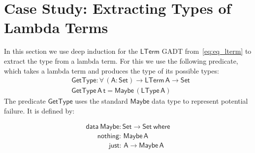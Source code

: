 \documentclass[9pt]{entcs}
\begin{document}
\section{Case Study: Extracting Types of Lambda Terms}\label{sec:app}

In this section we use deep induction for the $\mathsf{LTerm}$ GADT
from~\eqref{eq:eq_lterm} to extract the type from a lambda term.  For
this we use the following predicate, which takes a lambda term and
produces the type of its possible types:
\begin{align*}
  &\mathsf{GetType : \forall \, (A : Set) \to LTerm\,A \to Set} \\
  &\mathsf{GetType \,A \,t = Maybe \, (LType \, A)}
\end{align*}
The predicate $\mathsf{GetType}$ uses the standard $\mathsf{Maybe}$
data type to represent potential failure. It is defined by:

\vspace*{-0.1in}

\begin{equation}\label{eq:maybe}
\begin{array}{l}
\mathsf{data\ Maybe : Set \to Set\ where}\\
\mathsf{\;\;\;\;\;\;nothing :\, Maybe\,A}\\
\mathsf{\;\;\;\;\;\;\;\;\;\;\;\;just :\, A \to Maybe\,A}
\end{array}
\end{equation}
\end{document}
